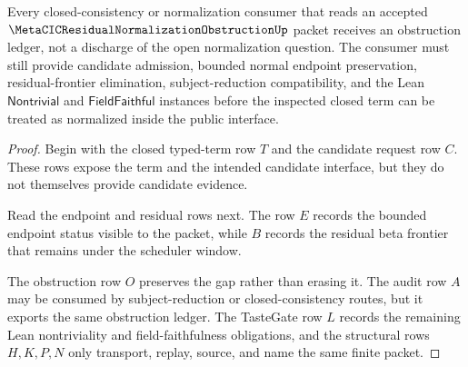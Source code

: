 \begin{theorem}
\label{thm:metacic-residual-normalization-obstruction-boundary}
Every closed-consistency or normalization consumer that reads an accepted $\MetaCICResidualNormalizationObstructionUp$ packet receives an obstruction ledger, not a discharge of the open normalization question. The consumer must still provide candidate admission, bounded normal endpoint preservation, residual-frontier elimination, subject-reduction compatibility, and the Lean $\mathsf{Nontrivial}$ and $\mathsf{FieldFaithful}$ instances before the inspected closed term can be treated as normalized inside the public interface.
\end{theorem}
\begin{proof}
Begin with the closed typed-term row $T$ and the candidate request row $C$. These rows expose the term and the intended candidate interface, but they do not themselves provide candidate evidence.

Read the endpoint and residual rows next. The row $E$ records the bounded endpoint status visible to the packet, while $B$ records the residual beta frontier that remains under the scheduler window.

The obstruction row $O$ preserves the gap rather than erasing it. The audit row $A$ may be consumed by subject-reduction or closed-consistency routes, but it exports the same obstruction ledger. The TasteGate row $L$ records the remaining Lean nontriviality and field-faithfulness obligations, and the structural rows $H,K,P,N$ only transport, replay, source, and name the same finite packet.
\end{proof}



